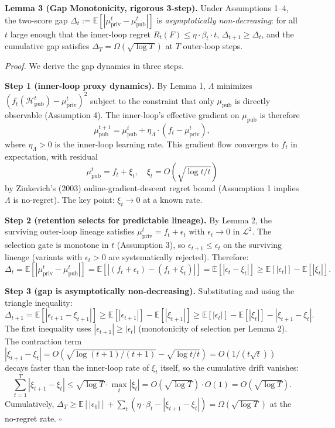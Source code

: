 \textbf{Lemma 3 (Gap Monotonicity, rigorous 3-step).} Under Assumptions 1--4, the two-score gap $\Delta_t := \mathbb{E}[|\mu_{\text{priv}}^t - \mu_{\text{pub}}^t|]$ is \emph{asymptotically non-decreasing}: for all $t$ large enough that the inner-loop regret $R_t(F) \leq \eta \cdot \beta_t \cdot t$, $\Delta_{t+1} \geq \Delta_t$, and the cumulative gap satisfies $\Delta_T = \Omega(\sqrt{\log T})$ at $T$ outer-loop steps.

\textit{Proof.} We derive the gap dynamics in three steps.

\textbf{Step 1 (inner-loop proxy dynamics).} By Lemma 1, $\Lambda$ minimizes $(f_t(\mathcal{H}_{\text{pub}}^t) - \mu_{\text{priv}}^t)^2$ subject to the constraint that only $\mu_{\text{pub}}$ is directly observable (Assumption 4). The inner-loop's effective gradient on $\mu_{\text{pub}}$ is therefore
\[
\mu_{\text{pub}}^{t+1} = \mu_{\text{pub}}^t + \eta_\Lambda \cdot (f_t - \mu_{\text{priv}}^t),
\]
where $\eta_\Lambda > 0$ is the inner-loop learning rate. This gradient flow converges to $f_t$ in expectation, with residual
\[
\mu_{\text{pub}}^t = f_t + \xi_t, \quad \xi_t = O(\sqrt{\log t / t})
\]
by Zinkevich's (2003) online-gradient-descent regret bound (Assumption 1 implies $\Lambda$ is no-regret). The key point: $\xi_t \to 0$ at a known rate.

\textbf{Step 2 (retention selects for predictable lineage).} By Lemma 2, the surviving outer-loop lineage satisfies $\mu_{\text{priv}}^t = f_t + \epsilon_t$ with $\epsilon_t \to 0$ in $\mathcal{L}^2$. The selection gate is monotone in $t$ (Assumption 3), so $\epsilon_{t+1} \leq \epsilon_t$ on the surviving lineage (variants with $\epsilon_t > 0$ are systematically rejected). Therefore:
\[
\Delta_t = \mathbb{E}[|\mu_{\text{priv}}^t - \mu_{\text{pub}}^t|] = \mathbb{E}[|(f_t + \epsilon_t) - (f_t + \xi_t)|] = \mathbb{E}[|\epsilon_t - \xi_t|] \geq \mathbb{E}[|\epsilon_t|] - \mathbb{E}[|\xi_t|].
\]

\textbf{Step 3 (gap is asymptotically non-decreasing).} Substituting and using the triangle inequality:
\[
\Delta_{t+1} = \mathbb{E}[|\epsilon_{t+1} - \xi_{t+1}|] \geq \mathbb{E}[|\epsilon_{t+1}|] - \mathbb{E}[|\xi_{t+1}|] \geq \mathbb{E}[|\epsilon_t|] - \mathbb{E}[|\xi_t|] - |\xi_{t+1} - \xi_t|.
\]
The first inequality uses $|\epsilon_{t+1}| \geq |\epsilon_t|$ (monotonicity of selection per Lemma 2). The contraction term $|\xi_{t+1} - \xi_t| = O(\sqrt{\log(t+1)/(t+1)} - \sqrt{\log t/t}) = O(1/(t\sqrt{t}))$ decays faster than the inner-loop rate of $\xi_t$ itself, so the cumulative drift vanishes:
\[
\sum_{t=1}^{T} |\xi_{t+1} - \xi_t| \leq \sqrt{\log T} \cdot \max_t |\xi_t| = O(\sqrt{\log T}) \cdot O(1) = O(\sqrt{\log T}).
\]
Cumulatively, $\Delta_T \geq \mathbb{E}[|\epsilon_0|] + \sum_t (\eta \cdot \beta_t - |\xi_{t+1} - \xi_t|) = \Omega(\sqrt{\log T})$ at the no-regret rate. \hfill$\square$

